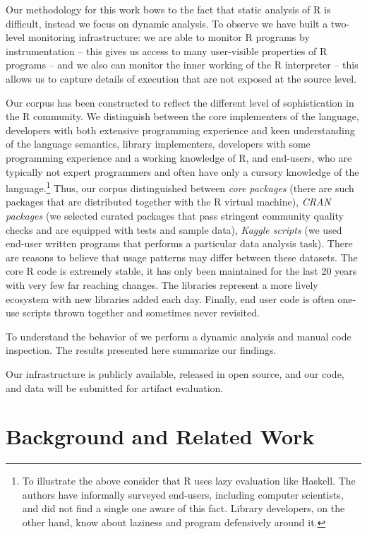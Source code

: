 \documentclass[conference]{IEEEtran}
\begin{document}
Our methodology for this work bows to the fact that static analysis of R is
difficult, instead we focus on dynamic analysis. To observe \eval we have
built a two-level monitoring infrastructure: we are able to monitor R
programs by instrumentation -- this gives us access to many user-visible
properties of R programs -- and we also can monitor the inner working of the
R interpreter -- this allows us to capture details of execution that are not
exposed at the source level.

Our corpus has been constructed to reflect the different level of
sophistication in the R community. We distinguish between the core
implementers of the language, developers with both extensive programming
experience and keen understanding of the language semantics, library
implementers, developers with some programming experience and a working
knowledge of R, and end-users, who are typically not expert programmers and
often have only a cursory knowledge of the language.\footnote{To illustrate
  the above consider that R uses lazy evaluation like Haskell. The authors
  have informally surveyed end-users, including computer scientists, and did
  not find a single one aware of this fact. Library developers, on the other
  hand, know about laziness and program defensively around it.}  Thus, our
corpus distinguished between \emph{core packages} (there are
\CorpusCorePackages such packages that are distributed together with the R
virtual machine), \emph{CRAN packages} (we selected \CorpusPackages curated
packages that pass stringent community quality checks and are equipped with
tests and sample data), \emph{Kaggle scripts} (we used \CorpusFinishedKaggle
end-user written programs that performs a particular data analysis
task). There are reasons to believe that \eval usage patterns may differ
between these datasets. The core R code is extremely stable, it has only
been maintained for the last 20 years with very few far reaching
changes. The libraries represent a more lively ecosystem with new libraries
added each day.  Finally, end user code is often one-use scripts thrown
together and sometimes never revisited.


To understand the behavior of \eval we perform a dynamic analysis and manual
code inspection. The results presented here summarize our findings.

Our infrastructure is publicly available, released in open source, and our
code, and data will be submitted for artifact evaluation.


\section{Background and Related Work}
\end{document}
